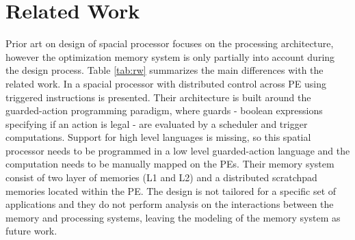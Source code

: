 
\section{Related Work}






Prior art on design of spacial processor focuses on the processing architecture, however the optimization memory system is only partially into account during the design process.
Table \ref{tab:rw} summarizes the main differences with the related work.
In \cite{parashar2014efficient} a spacial processor with distributed control across PE using triggered instructions is presented. Their architecture is built around the guarded-action programming paradigm, where guards - boolean expressions specifying if an action is legal - are evaluated by a scheduler and trigger computations. Support for high level languages is missing, so this spatial processor needs to be programmed in a low level guarded-action language and the computation needs to be manually mapped on the PEs. Their memory system consist of two layer of memories (L1 and L2) and a distributed scratchpad memories located within the PE. The design is not tailored for a specific set of applications and they do not perform analysis on the interactions between the memory and processing systems, leaving the modeling of the memory system as future work.

